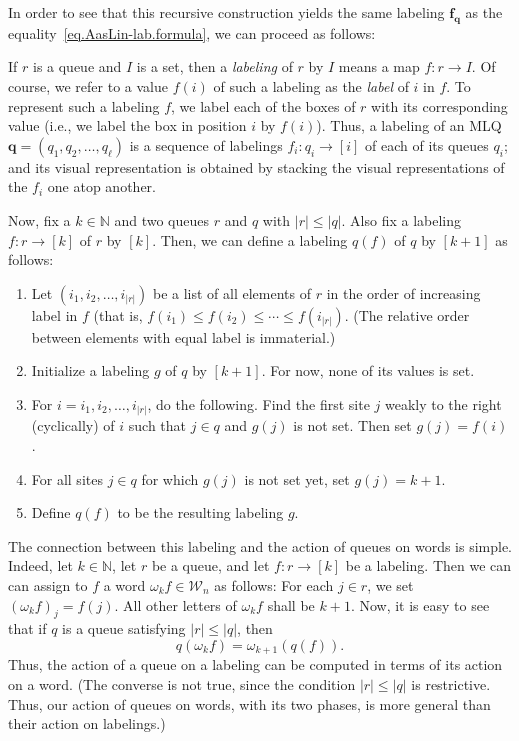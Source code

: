 \documentclass[reqno]{amsart}
\newcommand{\0}{\phantom{c}}
\newcommand{\ff}{\mathbf{f}}
\newcommand{\qq}{\mathbf{q}}
\newcommand{\mcW}{\mathcal{W}}
\newcommand{\NN}{\mathbb{N}}
\newenvironment{verlong}{}{}
\newcommand{\abs}[1]{\left| #1 \right|}
\newcommand{\tup}[1]{\left( #1 \right)}
\newcommand{\ive}[1]{\left[ #1 \right]}
\newcommand{\defn}[1]{{\color{darkred}\emph{#1}}} %
\theoremstyle{plain}
\theoremstyle{definition}
\numberwithin{equation}{section}
\begin{document}
\begin{verlong}
In order to see that this recursive construction yields the same labeling $\ff_\qq$ as the equality~\eqref{eq.AasLin-lab.formula}, we can proceed as follows:

If $r$ is a queue and $I$ is a set, then a \defn{labeling} of $r$ by $I$ means a map $f \colon r \to I$.
Of course, we refer to a value $f \tup{i}$ of such a labeling as the \defn{label} of $i$ in $f$.
To represent such a labeling $f$, we label each of the boxes of $r$ with its corresponding value (i.e., we label the box in position $i$ by $f\tup{i}$).
Thus, a labeling of an MLQ $\qq = (q_1, q_2, \dotsc, q_{\ell})$ is a sequence of labelings $f_i \colon q_i \to \ive{i}$ of each of its queues $q_i$; and its visual representation is obtained by stacking the visual representations of the $f_i$ one atop another.

Now, fix a $k \in \NN$ and two queues $r$ and $q$ with $\abs{r} \leq \abs{q}$. Also fix a labeling $f \colon r \to \ive{k}$ of $r$ by $\ive{k}$.
Then, we can define a labeling \defn{$q(f)$} of $q$ by $\ive{k+1}$ as follows:
\begin{enumerate}
\item Let $\tup{i_1, i_2, \ldots, i_{\abs{r}}}$ be a list of all elements of $r$ in the order of increasing label in $f$ (that is, $f(i_1) \leq f(i_2) \leq \cdots \leq f(i_{\abs{r}})$.
 (The relative order between elements with equal label is immaterial.)

\item Initialize a labeling $g$ of $q$ by $\ive{k+1}$. For now, none of its values is set.

\item For $i = i_1, i_2, \ldots, i_{\abs{r}}$, do the following.
    Find the first site $j$ weakly to the right (cyclically) of $i$ such that $j \in q$ and $g\tup{j}$ is not set.
    Then set $g\tup{j} = f\tup{i}$.

\item For all sites $j \in q$ for which $g \tup{j}$ is not set yet, set $g \tup{j} = k+1$.

\item Define $q(f)$ to be the resulting labeling $g$.
\end{enumerate}

The connection between this labeling and the action of queues on words is simple.
Indeed, let $k \in \NN$, let $r$ be a queue, and let $f \colon r \to \ive{k}$ be a labeling.
Then we can can assign to $f$ a word $\omega_k f \in \mcW_n$ as follows:
For each $j \in r$, we set $\tup{\omega_k f}_j = f \tup{j}$.
All other letters of $\omega_k f$ shall be $k+1$.
Now, it is easy to see that if $q$ is a queue satisfying $\abs{r} \leq \abs{q}$, then
\begin{equation}
q \tup{ \omega_k f } = \omega_{k+1} \tup{ q(f) } .
\label{eq.AasLin-lab.two-actions}
\end{equation}
Thus, the action of a queue on a labeling can be computed in terms of its action on a word.
(The converse is not true, since the condition $\abs{r} \leq \abs{q}$ is restrictive.
Thus, our action of queues on words, with its two phases, is more general than their
action on labelings.)


\end{verlong}
\end{document}
